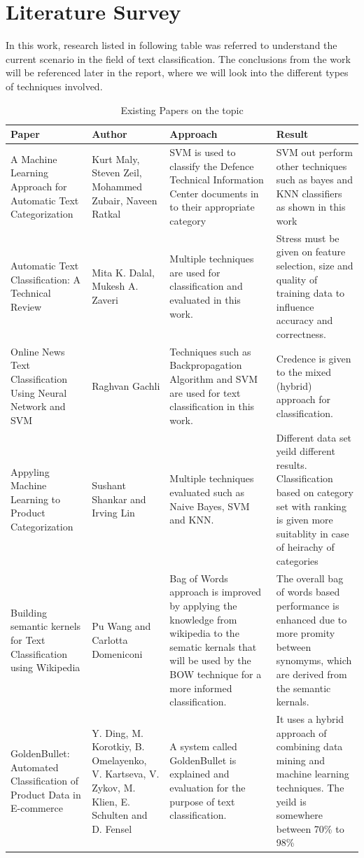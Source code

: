 \documentclass[12pt]{book}
\begin{document}
\chapter{Literature Survey}

In this work, research listed in following table was referred to understand the current scenario in the field of text classification.
The conclusions from the work will be referenced later in the report, where we will look into the different types of techniques involved.


\begin{longtable}[c]{ |p{3cm}|p{3cm}|p{3cm}|p{3cm}|  }
  \caption{Existing Papers on the topic \label{tab:existing_worexisting_work}}\\
  \hline
  Paper & Author & Approach & Result\\
  \hline
  \endhead

  A Machine Learning Approach for Automatic Text Categorization & Kurt Maly, Steven Zeil,  Mohammed Zubair, Naveen Ratkal& SVM is used to classify the Defence Technical Information Center documents in to their appropriate category& SVM out perform other techniques such as bayes and KNN classifiers as shown in this work\\ 
  \hline
  Automatic Text Classification: A Technical Review & Mita K. Dalal, Mukesh A. Zaveri & Multiple techniques are used for classification and evaluated in this work.& Stress must be given on feature selection, size and quality of training data to influence accuracy and correctness.\\ 
  \hline
  Online News Text Classification Using Neural Network and SVM& Raghvan Gachli & Techniques such as Backpropagation Algorithm and SVM are used for text classification in this work. & Credence is given to the mixed (hybrid) approach for classification.\\ 
  \hline
  Appyling Machine Learning to Product Categorization & Sushant Shankar and Irving Lin& Multiple techniques evaluated such as Naive Bayes, SVM and KNN. & Different data set yeild different results. Classification based on category set with ranking is given more suitablity in case of heirachy of categories\\ 
  \hline
  Building semantic kernels for Text Classification using Wikipedia& Pu Wang and Carlotta Domeniconi& Bag of Words approach is improved by applying the knowledge from wikipedia to the sematic kernals that will be used by the BOW technique for a more informed classification. & The overall bag of words based performance is enhanced due to more promity between synomyms, which are derived from the semantic kernals.\\ 
  \hline
  GoldenBullet: Automated Classification of Product Data in E-commerce & Y. Ding, M. Korotkiy, B. Omelayenko, V. Kartseva, V. Zykov, M. Klien, E. Schulten and D. Fensel & A system called GoldenBullet is explained and evaluation for the purpose of text classification. & It uses a hybrid approach of combining data mining and machine learning techniques. The yeild is somewhere between 70\% to 98\%\\
  \hline

\end{longtable}
\end{document}
